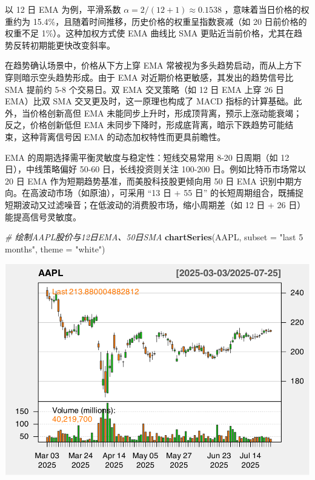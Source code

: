 \documentclass[]{ctexbook}
\newenvironment{Shaded}{\begin{snugshade}}{\end{snugshade}}
\newcommand{\AttributeTok}[1]{\textcolor[rgb]{0.13,0.29,0.53}{#1}}
\newcommand{\CommentTok}[1]{\textcolor[rgb]{0.56,0.35,0.01}{\textit{#1}}}
\newcommand{\FunctionTok}[1]{\textcolor[rgb]{0.13,0.29,0.53}{\textbf{#1}}}
\newcommand{\NormalTok}[1]{#1}
\newcommand{\StringTok}[1]{\textcolor[rgb]{0.31,0.60,0.02}{#1}}
\begin{document}
以 12 日 EMA 为例，平滑系数 \(\alpha = 2/(12+1) \approx 0.1538\) ，意味着当日价格的权重约为 15.4\%，且随着时间推移，历史价格的权重呈指数衰减（如 20 日前价格的权重不足 1\%）。这种加权方式使 EMA 曲线比 SMA 更贴近当前价格，尤其在趋势反转初期能更快改变斜率。

在趋势确认场景中，价格从下方上穿 EMA 常被视为多头趋势启动，而从上方下穿则暗示空头趋势形成。由于 EMA 对近期价格更敏感，其发出的趋势信号比 SMA 提前约 5-8 个交易日。双 EMA 交叉策略（如 12 日 EMA 上穿 26 日 EMA）比双 SMA 交叉更及时，这一原理也构成了 MACD 指标的计算基础。此外，当价格创新高但 EMA 未能同步上升时，形成顶背离，预示上涨动能衰竭；反之，价格创新低但 EMA 未同步下降时，形成底背离，暗示下跌趋势可能结束，这种背离信号因 EMA 的动态加权特性而更具前瞻性。

EMA 的周期选择需平衡灵敏度与稳定性：短线交易常用 8-20 日周期（如 12 日），中线策略偏好 50-60 日，长线投资则关注 100-200 日。例如比特币市场常以 20 日 EMA 作为短期趋势基准，而美股科技股更倾向用 50 日 EMA 识别中期方向。在高波动市场（如原油），可采用 ``13 日 + 55 日'' 的长短周期组合，既捕捉短期波动又过滤噪音；在低波动的消费股市场，缩小周期差（如 12 日 + 26 日）能提高信号灵敏度。

\begin{Shaded}
\begin{Highlighting}[]
\CommentTok{\# 绘制AAPL股价与12日EMA、50日SMA}
\FunctionTok{chartSeries}\NormalTok{(AAPL, }\AttributeTok{subset =} \StringTok{"last 5 months"}\NormalTok{, }\AttributeTok{theme =} \StringTok{"white"}\NormalTok{)}
\end{Highlighting}
\end{Shaded}

\includegraphics[width=0.9\linewidth]{QuantmodHandbook_files/figure-latex/ema-1}
\end{document}
